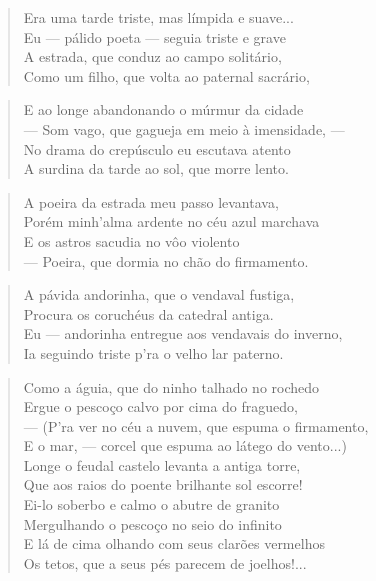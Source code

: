 \begin{anexosenv}
\begin{verse}
Era uma tarde triste, mas límpida e suave... \\
Eu — pálido poeta — seguia triste e grave \\
A estrada, que conduz ao campo solitário, \\
Como um filho, que volta ao paternal sacrário, \\
\end{verse}

\begin{verse}
E ao longe abandonando o múrmur da cidade \\
— Som vago, que gagueja em meio à imensidade, — \\
No drama do crepúsculo eu escutava atento \\
A surdina da tarde ao sol, que morre lento. \\
\end{verse}

\begin{verse}
A poeira da estrada meu passo levantava, \\
Porém minh'alma ardente no céu azul marchava \\
E os astros sacudia no vôo violento \\
— Poeira, que dormia no chão do firmamento. \\
\end{verse}

\begin{verse}
A pávida andorinha, que o vendaval fustiga, \\
Procura os coruchéus da catedral antiga. \\
Eu — andorinha entregue aos vendavais do inverno, \\
Ia seguindo triste p'ra o velho lar paterno. \\
\end{verse}

\begin{verse}
Como a águia, que do ninho talhado no rochedo \\
Ergue o pescoço calvo por cima do fraguedo, \\
— (P'ra ver no céu a nuvem, que espuma o firmamento, \\
E o mar, — corcel que espuma ao látego do vento...) \\
Longe o feudal castelo levanta a antiga torre, \\
Que aos raios do poente brilhante sol escorre! \\
Ei-lo soberbo e calmo o abutre de granito \\
Mergulhando o pescoço no seio do infinito \\
E lá de cima olhando com seus clarões vermelhos \\
Os tetos, que a seus pés parecem de joelhos!... \\
\end{verse}


\end{anexosenv}
